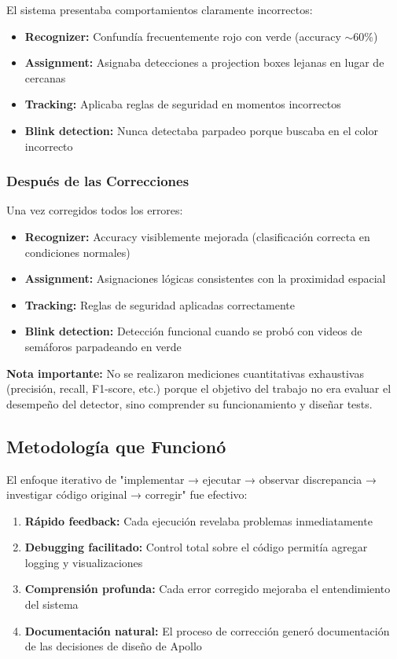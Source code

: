 El sistema presentaba comportamientos claramente incorrectos:

\begin{itemize}
    \item \textbf{Recognizer:} Confundía frecuentemente rojo con verde (accuracy $\sim$60\%)
    \item \textbf{Assignment:} Asignaba detecciones a projection boxes lejanas en lugar de cercanas
    \item \textbf{Tracking:} Aplicaba reglas de seguridad en momentos incorrectos
    \item \textbf{Blink detection:} Nunca detectaba parpadeo porque buscaba en el color incorrecto
\end{itemize}

\subsubsection{Después de las Correcciones}

Una vez corregidos todos los errores:

\begin{itemize}
    \item \textbf{Recognizer:} Accuracy visiblemente mejorada (clasificación correcta en condiciones normales)
    \item \textbf{Assignment:} Asignaciones lógicas consistentes con la proximidad espacial
    \item \textbf{Tracking:} Reglas de seguridad aplicadas correctamente
    \item \textbf{Blink detection:} Detección funcional cuando se probó con videos de semáforos parpadeando en verde
\end{itemize}

\textbf{Nota importante:} No se realizaron mediciones cuantitativas exhaustivas (precisión, recall, F1-score, etc.) porque el objetivo del trabajo no era evaluar el desempeño del detector, sino comprender su funcionamiento y diseñar tests.

\subsection{Metodología que Funcionó}

El enfoque iterativo de "implementar → ejecutar → observar discrepancia → investigar código original → corregir" fue efectivo:

\begin{enumerate}
    \item \textbf{Rápido feedback:} Cada ejecución revelaba problemas inmediatamente
    \item \textbf{Debugging facilitado:} Control total sobre el código permitía agregar logging y visualizaciones
    \item \textbf{Comprensión profunda:} Cada error corregido mejoraba el entendimiento del sistema
    \item \textbf{Documentación natural:} El proceso de corrección generó documentación de las decisiones de diseño de Apollo
\end{enumerate}

